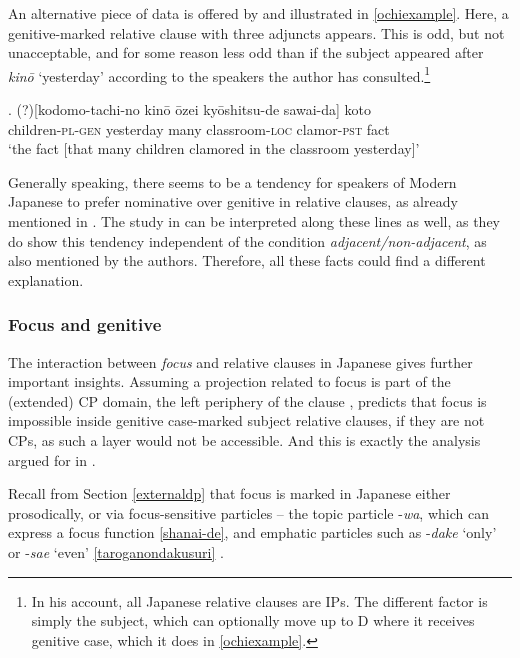 An alternative piece of data is offered by \citet{ochi:2021:feature} and illustrated in \ref{ochiexample}. Here, a genitive-marked relative clause with three adjuncts appears. This is odd, but not unacceptable, and for some reason less odd than if the subject appeared after \textit{kinō} `yesterday' according to the speakers the author has consulted.\footnote{In his account, all Japanese relative clauses are IPs. The different factor is simply the subject, which can optionally move up to D where it receives genitive case, which it does in \ref{ochiexample}.}

\exg. (?)[kodomo-tachi-no kinō ōzei kyōshitsu-de sawai-da] koto\\
children-\textsc{pl-gen} yesterday many classroom-\textsc{loc} clamor-\textsc{pst} fact\\
`the fact [that many children clamored in the classroom yesterday]’ \\ \null\hfill \citep[326]{ochi:2021:feature} \label{ochiexample}

Generally speaking, there seems to be a tendency for speakers of Modern Japanese to prefer nominative over genitive in relative clauses, as already mentioned in \citet{harada:1971:ga}. The study in \citet{nambu:2014:an, nambu:2023:experimental} can be interpreted along these lines as well, as they do show this tendency independent of the condition \textit{adjacent/non-adjacent}, as also mentioned by the authors. Therefore, all these facts could find a different explanation.

\subsubsection{Focus and genitive} \label{focusrc}

The interaction between \textit{focus} and relative clauses in Japanese gives further important insights. Assuming a projection related to focus is part of the (extended) CP domain, the left periphery of the clause \citep{rizzi:1997:the}, predicts that focus is impossible inside genitive case-marked subject relative clauses, if they are not CPs, as such a layer would not be accessible. And this is exactly the analysis argued for in \citet{miyagawa:2017:agreement}.

Recall from Section \ref{externaldp} that focus is marked in Japanese either prosodically, or via focus-sensitive particles – the topic particle -\textit{wa}, which can express a focus function \ref{shanai-de}, and emphatic particles such as -\textit{dake} `only' or -\textit{sae} `even’ \ref{taroganondakusuri} \citep{tomioka:2009:contrastive, tomioka:2016:infor, vermeulen:2007:jap}.

